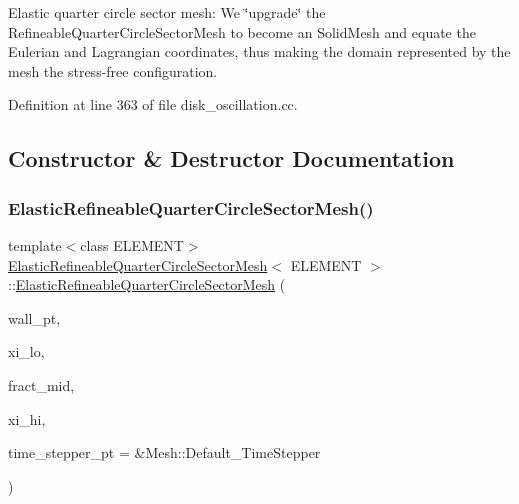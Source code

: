 Elastic quarter circle sector mesh\+: We \char`\"{}upgrade\char`\"{} the Refineable\+Quarter\+Circle\+Sector\+Mesh to become an Solid\+Mesh and equate the Eulerian and Lagrangian coordinates, thus making the domain represented by the mesh the stress-\/free configuration. 

Definition at line 363 of file disk\+\_\+oscillation.\+cc.



\subsection{Constructor \& Destructor Documentation}
\mbox{\label{classElasticRefineableQuarterCircleSectorMesh_a123699deecd2a908a7a882a9d2a9f4dd}} 
\subsubsection{\texorpdfstring{Elastic\+Refineable\+Quarter\+Circle\+Sector\+Mesh()}{ElasticRefineableQuarterCircleSectorMesh()}}
{\footnotesize\ttfamily template$<$class E\+L\+E\+M\+E\+NT$>$ \\
\hyperlink{classElasticRefineableQuarterCircleSectorMesh}{Elastic\+Refineable\+Quarter\+Circle\+Sector\+Mesh}$<$ E\+L\+E\+M\+E\+NT $>$\+::\hyperlink{classElasticRefineableQuarterCircleSectorMesh}{Elastic\+Refineable\+Quarter\+Circle\+Sector\+Mesh} (\begin{DoxyParamCaption}\item[{Geom\+Object $\ast$}]{wall\+\_\+pt,  }\item[{const double \&}]{xi\+\_\+lo,  }\item[{const double \&}]{fract\+\_\+mid,  }\item[{const double \&}]{xi\+\_\+hi,  }\item[{Time\+Stepper $\ast$}]{time\+\_\+stepper\+\_\+pt = {\ttfamily \&Mesh\+:\+:Default\+\_\+TimeStepper} }\end{DoxyParamCaption})\hspace{0.3cm}{\ttfamily [inline]}}



